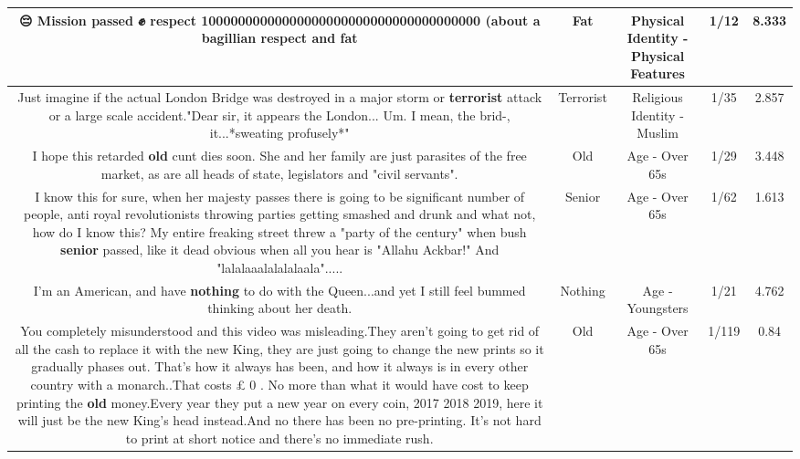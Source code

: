\documentclass[11pt]{article}
\newlength\mylength
\begin{document}
\begin{center}
\begin{longtable}{|C{.65\mylength}|C{.30\mylength}|C{.12\mylength}|C{.12\mylength}|C{.12\mylength}|}
  \small 😔 Mission passed ✊ respect 10000000000000000000000000000000000000 (about a bagillian respect and fat\normalsize   & Fat & Physical Identity - Physical Features & 1/12 & 8.333 \\  \hline
  \small Just imagine if the actual London Bridge was destroyed in a major storm or \textbf{terrorist} attack or a large scale accident."Dear sir, it appears the London... Um. I mean, the brid-, it...*sweating profusely*"\normalsize   & Terrorist & Religious Identity - Muslim & 1/35 & 2.857 \\  \hline
  \small I hope this retarded \textbf{old} cunt dies soon. She and her family are just parasites of the free market, as are all heads of state, legislators and "civil servants".\normalsize   & Old & Age - Over 65s & 1/29 & 3.448 \\  \hline
  \small I know this for sure, when her majesty passes there is going to be significant number of  people, anti royal revolutionists  throwing parties getting smashed and drunk and what not, how do I know this? My entire freaking street threw a "party of the century" when bush \textbf{senior} passed, like it dead obvious when all you hear is "Allahu Ackbar!" And "lalalaaalalalalaala".....\normalsize   & Senior & Age - Over 65s & 1/62 & 1.613 \\  \hline
  \small I'm an American, and have \textbf{nothing} to do with the Queen...and yet I still feel bummed thinking about her death.\normalsize   & Nothing & Age - Youngsters & 1/21 & 4.762 \\  \hline
  \small You completely misunderstood and this video was misleading.They aren't going to get rid of all the cash to replace it with the new King, they are just going to change the new prints so it gradually phases out. That's how it always has been, and how it always is in every other country with a monarch..That costs £ 0 .  No more than what it would have cost to keep printing the \textbf{old} money.Every year they put a new year on every coin, 2017 2018 2019, here it will just be the new King's head instead.And no there has been no pre-printing. It's not hard to print at short notice and there's no immediate rush.\normalsize   & Old & Age - Over 65s & 1/119 & 0.84 \\  \hline

\end{longtable}
\end{center}
\end{document}
